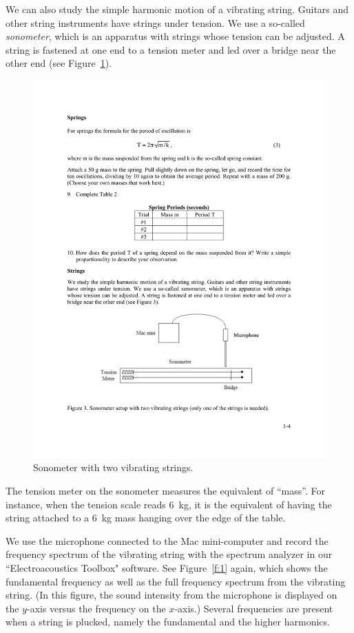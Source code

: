 \documentclass[11pt]{NSF}
\begin{document}
We can also study the simple harmonic motion of a vibrating string. 
Guitars and other string instruments have strings under tension. 
We use a so-called {\em sonometer},
which is an apparatus with strings whose tension can be adjusted. 
A string is fastened at one end to a tension meter and led over a 
bridge near the other end (see Figure~\ref{f:3}).
%
\begin{figure}[hbtp]
\begin{center}
\includegraphics[width=.75\textwidth]{fig1_3}
\caption{Sonometer with two vibrating strings.}
\label{f:3}
\end{center}
\end{figure}
%

The tension meter on the sonometer measures the equivalent of ``mass”. 
For instance, when the tension scale reads 6~kg, it is the equivalent 
of having the string attached to a 6~kg mass hanging over the edge 
of the table.

We use the microphone connected to the Mac mini-computer and 
record the frequency spectrum of the vibrating string with the 
spectrum analyzer in our ``Electroacoustics Toolbox" software. 
See Figure~\ref{f:1} again, which shows the fundamental frequency 
as well as the full frequency spectrum from the vibrating string. 
(In this figure, the sound intensity from the microphone is
displayed on the $y$-axis versus the frequency on the $x$-axis.) 
Several frequencies are present when a string is plucked, namely 
the fundamental and the higher harmonics.
\end{document}
